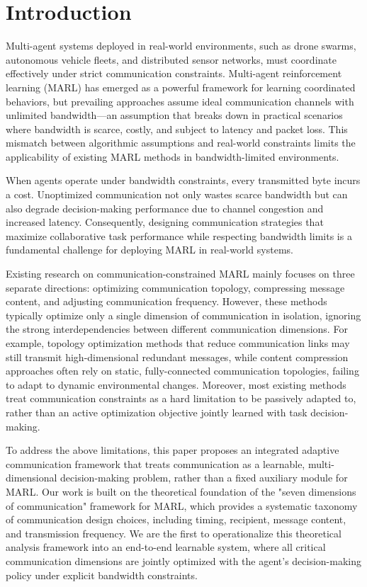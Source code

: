 \documentclass[10pt, twocolumn]{IEEEtran}
\begin{document}
\section{Introduction}
Multi-agent systems deployed in real-world environments, such as drone swarms, autonomous vehicle fleets, and distributed sensor networks, must coordinate effectively under strict communication constraints. Multi-agent reinforcement learning (MARL) has emerged as a powerful framework for learning coordinated behaviors, but prevailing approaches assume ideal communication channels with unlimited bandwidth—an assumption that breaks down in practical scenarios where bandwidth is scarce, costly, and subject to latency and packet loss. This mismatch between algorithmic assumptions and real-world constraints limits the applicability of existing MARL methods in bandwidth-limited environments.

When agents operate under bandwidth constraints, every transmitted byte incurs a cost. Unoptimized communication not only wastes scarce bandwidth but can also degrade decision-making performance due to channel congestion and increased latency. Consequently, designing communication strategies that maximize collaborative task performance while respecting bandwidth limits is a fundamental challenge for deploying MARL in real-world systems.

Existing research on communication-constrained MARL mainly focuses on three separate directions: optimizing communication topology, compressing message content, and adjusting communication frequency. However, these methods typically optimize only a single dimension of communication in isolation, ignoring the strong interdependencies between different communication dimensions. For example, topology optimization methods that reduce communication links may still transmit high-dimensional redundant messages, while content compression approaches often rely on static, fully-connected communication topologies, failing to adapt to dynamic environmental changes. Moreover, most existing methods treat communication constraints as a hard limitation to be passively adapted to, rather than an active optimization objective jointly learned with task decision-making.

To address the above limitations, this paper proposes an integrated adaptive communication framework that treats communication as a learnable, multi-dimensional decision-making problem, rather than a fixed auxiliary module for MARL. Our work is built on the theoretical foundation of the "seven dimensions of communication" framework for MARL, which provides a systematic taxonomy of communication design choices, including timing, recipient, message content, and transmission frequency. We are the first to operationalize this theoretical analysis framework into an end-to-end learnable system, where all critical communication dimensions are jointly optimized with the agent's decision-making policy under explicit bandwidth constraints.
\end{document}
